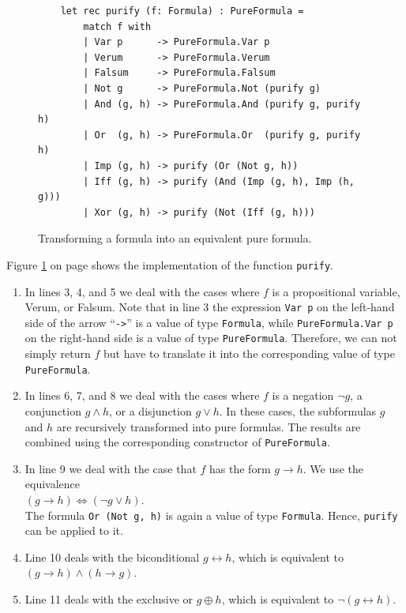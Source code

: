 \begin{figure}[!ht]
  \centering
\begin{verbatim}
    let rec purify (f: Formula) : PureFormula =
        match f with
        | Var p      -> PureFormula.Var p
        | Verum      -> PureFormula.Verum
        | Falsum     -> PureFormula.Falsum
        | Not g      -> PureFormula.Not (purify g)
        | And (g, h) -> PureFormula.And (purify g, purify h)
        | Or  (g, h) -> PureFormula.Or  (purify g, purify h)
        | Imp (g, h) -> purify (Or (Not g, h))
        | Iff (g, h) -> purify (And (Imp (g, h), Imp (h, g)))
        | Xor (g, h) -> purify (Not (Iff (g, h)))
\end{verbatim}
\vspace*{-0.3cm}
  \caption{Transforming a formula into an equivalent pure formula.}
  \label{fig:purify}
\end{figure}

Figure \ref{fig:purify} on page \pageref{fig:purify} shows the implementation of the
function \texttt{purify}. 
\begin{enumerate}
\item In lines 3, 4, and 5 we deal with the cases where $f$ is a propositional variable, Verum, or Falsum.
      Note that in line 3 the expression \texttt{Var p} on the left-hand side of the arrow ``\texttt{->}'' is a
      value of type \texttt{Formula}, while \texttt{PureFormula.Var p} on the right-hand side is a value of type
      \texttt{PureFormula}.  Therefore, we can not simply return $f$ but have to translate it into the
      corresponding value of type \texttt{PureFormula}.
\item In lines 6, 7, and 8 we deal with the cases where $f$ is a negation $\neg g$, a conjunction
      $g \wedge h$, or a disjunction $g \vee h$.  In these cases, the subformulas $g$ and $h$ are recursively
      transformed into pure formulas.  The results are combined using the corresponding constructor of
      \texttt{PureFormula}.
\item In line 9 we deal with the case that $f$ has the form $g \rightarrow h$.  We use the equivalence
      \\[0.2cm]
      \hspace*{1.3cm}
      $(g \rightarrow h) \Leftrightarrow (\neg g \vee h)$.
      \\[0.2cm]
      The formula \texttt{Or (Not g, h)} is again a value of type \texttt{Formula}.  Hence, \texttt{purify}
      can be applied to it.
\item Line 10 deals with the biconditional $g \leftrightarrow h$, which is equivalent to
      $(g \rightarrow h) \wedge (h \rightarrow g)$.
\item Line 11 deals with the exclusive or $g \oplus h$, which is equivalent to $\neg(g \leftrightarrow h)$.
\end{enumerate}
\FloatBarrier

